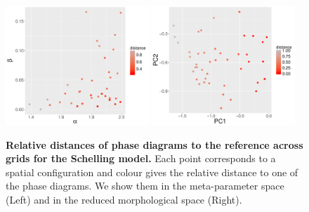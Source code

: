 \documentclass[3p,times,procedia]{elsarticle}
\begin{document}
\subsection*{}


\begin{figure}[h!]
\centering
\includegraphics[width=0.48\textwidth]{figures/schelling-relativedistance_metaparams_red}
\includegraphics[width=0.48\textwidth]{figures/schelling-relativedistance_morphspace_red}
\caption{\textbf{Relative distances of phase diagrams to the reference across grids for the Schelling model.} Each point corresponds to a spatial configuration and colour gives the relative distance to one of the phase diagrams. We show them in the meta-parameter space (Left) and in the reduced morphological space (Right).\label{fig:schelling-distance-meta}}
\end{figure}


\subsection*{}
\end{document}
